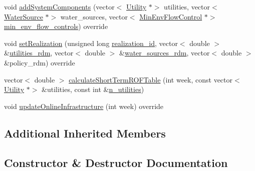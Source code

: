 \begin{DoxyCompactItemize}
void \mbox{\hyperlink{classInsuranceStorageToROF_ac7d317a7f189739275960e4f021108d8}{add\+System\+Components}} (vector$<$ \mbox{\hyperlink{classUtility}{Utility}} $\ast$$>$ utilities, vector$<$ \mbox{\hyperlink{classWaterSource}{Water\+Source}} $\ast$$>$ water\+\_\+sources, vector$<$ \mbox{\hyperlink{classMinEnvFlowControl}{Min\+Env\+Flow\+Control}} $\ast$$>$ \mbox{\hyperlink{classContinuityModel_afc991e5c0d144020e49a97751a04b302}{min\+\_\+env\+\_\+flow\+\_\+controls}}) override
\item 
void \mbox{\hyperlink{classInsuranceStorageToROF_a6318c3dca8b0c4d568eac494e5ccf712}{set\+Realization}} (unsigned long \mbox{\hyperlink{classContinuityModel_a7b6c99bf256f6c6b633ebb78282f43c7}{realization\+\_\+id}}, vector$<$ double $>$ \&\mbox{\hyperlink{classContinuityModel_aa4a00b76da6295d2faa11e3dcaea1896}{utilities\+\_\+rdm}}, vector$<$ double $>$ \&\mbox{\hyperlink{classContinuityModel_ab7b8fa93a6f56b328e425e1ead6cfefa}{water\+\_\+sources\+\_\+rdm}}, vector$<$ double $>$ \&policy\+\_\+rdm) override
\item 
vector$<$ double $>$ \mbox{\hyperlink{classInsuranceStorageToROF_a4a50c4b15aba302fe1e928fb0cc66d32}{calculate\+Short\+Term\+R\+O\+F\+Table}} (int week, const vector$<$ \mbox{\hyperlink{classUtility}{Utility}} $\ast$$>$ \&utilities, const int \&\mbox{\hyperlink{classContinuityModel_a6df6198ebc99a099df08f4b8ce6b52b9}{n\+\_\+utilities}})
\item 
void \mbox{\hyperlink{classInsuranceStorageToROF_a5870934b8b33e1d872eca7b0940398ac}{update\+Online\+Infrastructure}} (int week) override
\end{DoxyCompactItemize}
\subsection*{Additional Inherited Members}


\subsection{Constructor \& Destructor Documentation}
\mbox{\label{classInsuranceStorageToROF_a7769ebf2a6c73fa0efc55268712e8157}} 
